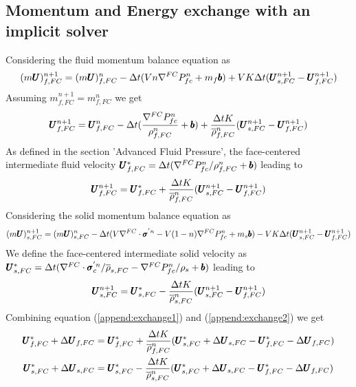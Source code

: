 \documentclass[preprint,12pt]{elsarticle}
\begin{document}
\subsection{\textsf{Momentum and Energy exchange with an implicit solver}}
%
%
Considering the fluid momentum balance equation as 
%
\begin{equation}
  (m\pmb{U})_{f,FC}^{n+1} =  (m\pmb{U})_{f,FC}^{n} - \Delta{t} (V n \nabla^{FC} P_{fc}^{n} + m_f \pmb{b}) + V K \Delta{t} (\pmb{U}_{s,FC}^{n+1} - \pmb{U}_{f,FC}^{n+1})
\end {equation}
%
%
Assuming $m_{f,FC}^{n+1} = m_{f,FC}^n$ we get
%
\begin{equation}
  \pmb{U}_{f,FC}^{n+1} =  \pmb{U}_{f,FC}^{n} - \Delta{t} (\frac{\nabla^{FC} P_{fc}^{n}}{\rho_{f,FC}^n} + \pmb{b}) + \frac{\Delta{t} K}{\overline{\rho}_{f,FC}^n} (\pmb{U}_{s,FC}^{n+1} - \pmb{U}_{f,FC}^{n+1})
\end {equation}
%
%
As defined in the section 'Advanced Fluid Pressure', the face-centered intermediate fluid velocity $\pmb{U}_{f,FC}^{*} = \Delta{t} (\nabla^{FC} P_{fc}^{n} / \rho_{f,FC}^n + \pmb{b})$ leading to
%
\begin{equation}
\label{append:exchange1}
  \pmb{U}_{f,FC}^{n+1} =  \pmb{U}_{f,FC}^{*} +  \frac{\Delta{t} K}{\overline{\rho}_{f,FC}^n} (\pmb{U}_{s,FC}^{n+1} - \pmb{U}_{f,FC}^{n+1})
\end {equation}
%
%
Considering the solid momentum balance equation as
%
\begin{equation}
  (m\pmb{U})_{s,FC}^{n+1} =  (m\pmb{U})_{s,FC}^{n} - \Delta{t} (V \nabla^{FC} \cdot \pmb{\sigma}^{'n} - V (1-n) \nabla^{FC} P_{fc}^{n} + m_s \pmb{b}) - V K \Delta{t} (\pmb{U}_{s,FC}^{n+1} - \pmb{U}_{f,FC}^{n+1})
\end {equation}
%
%
We define the face-centered intermediate solid velocity as $\pmb{U}_{s,FC}^{*} = \Delta{t} (\nabla^{FC} \cdot \pmb{\sigma}_c^{'n} / \overline{\rho}_{s,FC}  - \nabla^{FC} P_{fc}^{n} / \rho_s + \pmb{b})$ leading to
%
\begin{equation}
\label{append:exchange2}
  \pmb{U}_{s,FC}^{n+1} =  \pmb{U}_{s,FC}^{*} -  \frac{\Delta{t} K}{\overline{\rho}_{s,FC}^n} (\pmb{U}_{s,FC}^{n+1} - \pmb{U}_{f,FC}^{n+1})
\end {equation}
%
%
Combining equation (\ref{append:exchange1}) and (\ref{append:exchange2}) we get
%
\begin{equation}
\begin{gathered}
\label{append:exchange3}
  \pmb{U}_{f,FC}^{*} + \Delta \pmb{U}_{f,FC} =  \pmb{U}_{f,FC}^{*} +  \frac{\Delta{t} K}{\overline{\rho}_{f,FC}^n} (\pmb{U}_{s,FC}^{*} + \Delta \pmb{U}_{s,FC} - \pmb{U}_{f,FC}^{*} - \Delta \pmb{U}_{f,FC}) \\
  \pmb{U}_{s,FC}^{*} + \Delta \pmb{U}_{s,FC} =  \pmb{U}_{s,FC}^{*} -  \frac{\Delta{t} K}{\overline{\rho}_{s,FC}^n} (\pmb{U}_{s,FC}^{*} + \Delta \pmb{U}_{s,FC} - \pmb{U}_{f,FC}^{*} - \Delta \pmb{U}_{f,FC})
\end {gathered}
\end {equation}
\end{document}
